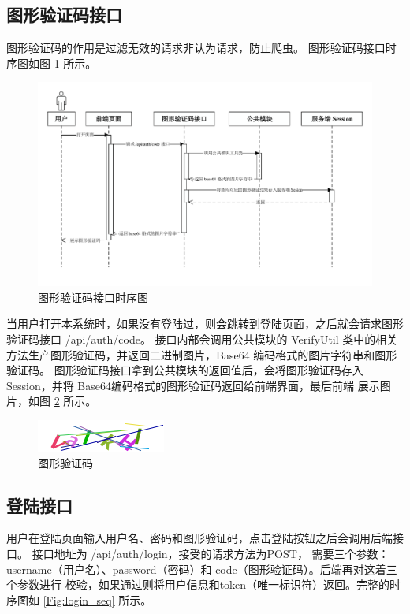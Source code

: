 \subsection{图形验证码接口}
图形验证码的作用是过滤无效的请求非认为请求，防止爬虫。
图形验证码接口时序图如图 \ref{Fig:code_seq} 所示。

\begin{figure}[ht]
    \centering
    \includegraphics[width=1\linewidth]{./Figure/IMG_code_seq.pdf}
    \caption{图形验证码接口时序图}\label{Fig:code_seq}
\end{figure}

当用户打开本系统时，如果没有登陆过，则会跳转到登陆页面，之后就会请求图形验证码接口 /api/auth/code。
接口内部会调用公共模块的 VerifyUtil 类中的相关方法生产图形验证码，并返回二进制图片，Base64 编码格式的图片字符串和图形验证码。
图形验证码接口拿到公共模块的返回值后，会将图形验证码存入Session，并将 Base64编码格式的图形验证码返回给前端界面，最后前端
展示图片，如图 \ref{Fig:code_eg} 所示。

\begin{figure}[ht]
    \centering
    \includegraphics[width=0.5\linewidth]{./Figure/IMG_code.png}
    \caption{图形验证码}\label{Fig:code_eg}
\end{figure}

\subsection{登陆接口}
用户在登陆页面输入用户名、密码和图形验证码，点击登陆按钮之后会调用后端接口。
接口地址为 /api/auth/login，接受的请求方法为POST，
需要三个参数：username（用户名）、password（密码）和 code（图形验证码）。后端再对这着三个参数进行
校验，如果通过则将用户信息和token（唯一标识符）返回。完整的时序图如 \ref{Fig:login_seq} 所示。

